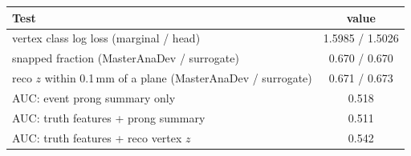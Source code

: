 \begin{tabular}{lc}
\toprule
Test & value \\
\midrule
vertex class log loss (marginal / head) & 1.5985 / 1.5026 \\
snapped fraction (MasterAnaDev / surrogate) & 0.670 / 0.670 \\
reco $z$ within 0.1\,mm of a plane (MasterAnaDev / surrogate) & 0.671 / 0.673 \\
\midrule
AUC: event prong summary only & 0.518 \\
AUC: truth features + prong summary & 0.511 \\
AUC: truth features + reco vertex $z$ & 0.542 \\
\bottomrule
\end{tabular}
